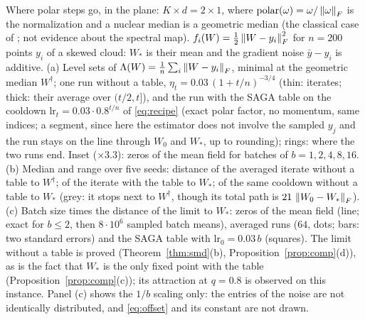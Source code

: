 \begin{explfigure}
\caption{Where polar steps go, in the plane: $K\times d=2\times1$, where $\polar(\omega)=\omega/\nF\omega$ is the normalization and a nuclear median is a geometric median (the classical case of \cite{cardot2013efficient}; not evidence about the spectral map). $f_i(W)=\frac12\nF{W-y_i}^2$ for $n=200$ points $y_i$ of a skewed cloud: $W_\ast$ is their mean and the gradient noise $\bar y-y_i$ is additive. (a) Level sets of $\Lambda(W)=\frac1n\sum_i\nF{W-y_i}$, minimal at the geometric median $W^\dagger$; one run without a table, $\eta_t=0.03\,(1+t/n)^{-3/4}$ (thin: iterates; thick: their average over $(t/2,t]$), and the run with the SAGA table on the cooldown $\mathrm{lr}_t=0.03\cdot0.8^{t/n}$ of \eqref{eq:recipe} (exact polar factor, no momentum, same indices; a segment, since here the estimator does not involve the sampled $y_j$ and the run stays on the line through $W_0$ and $W_\ast$, up to rounding); rings: where the two runs end. Inset ($\times3.3$): zeros of the mean field for batches of $b=1,2,4,8,16$. (b) Median and range over five seeds: distance of the averaged iterate without a table to $W^\dagger$; of the iterate with the table to $W_\ast$; of the same cooldown without a table to $W_\ast$ (grey: it stops next to $W^\dagger$, though its total path is $21\,\nF{W_0-W_\ast}$). (c) Batch size times the distance of the limit to $W_\ast$: zeros of the mean field (line; exact for $b\le2$, then $8\cdot10^6$ sampled batch means), averaged runs ($64$, dots; bars: two standard errors) and the SAGA table with $\mathrm{lr}_0=0.03\,b$ (squares). The limit without a table is proved (Theorem~\ref{thm:smd}(b), Proposition~\ref{prop:comp}(d)), as is the fact that $W_\ast$ is the only fixed point with the table (Proposition~\ref{prop:comp}(c)); its attraction at $q=0.8$ is observed on this instance. Panel (c) shows the $1/b$ scaling only: the entries of the noise are not identically distributed, and \eqref{eq:offset} and its constant are not drawn.}\label{fig:polarmedian}
\end{explfigure}

